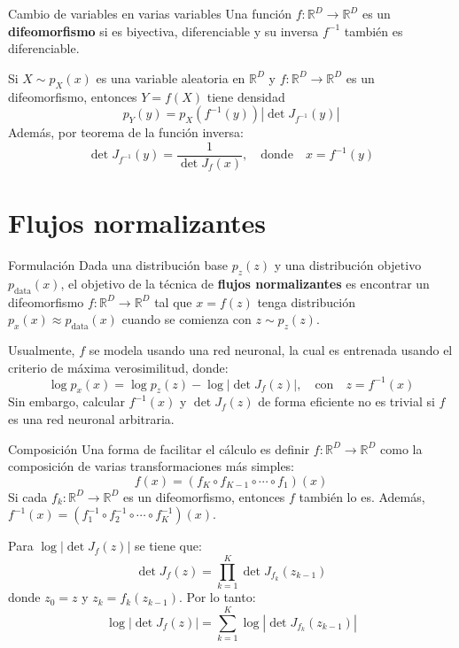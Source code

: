 \documentclass{beamer}
\newcommand{\R}{\mathbb{R}}
\begin{document}
\begin{frame}{Cambio de variables en varias variables}
    Una función $f:\R^D\to\R^D$ es un \textbf{difeomorfismo} si es biyectiva, diferenciable y su inversa $f^{-1}$ también es diferenciable.

    Si $X\sim p_X(x)$ es una variable aleatoria en $\R^D$ y $f:\R^D\to\R^D$ es un difeomorfismo, entonces $Y=f(X)$ tiene densidad
    \begin{equation*}
        p_Y(y) = p_X(f^{-1}(y))\left|\det J_{f^{-1}}(y)\right|
    \end{equation*}
    Además, por teorema de la función inversa:
    \begin{equation*}
        \det J_{f^{-1}}(y) = \frac{1}{\det J_f(x)},
        \quad\text{donde}\quad
        x = f^{-1}(y)
    \end{equation*}
\end{frame}

\section{Flujos normalizantes}

\begin{frame}{Formulación}
    Dada una distribución base $p_z(z)$ y una distribución objetivo $p_\text{data}(x)$, el objetivo de la técnica de \textbf{flujos normalizantes}
    es encontrar un difeomorfismo $f:\R^D\to\R^D$ tal que $x=f(z)$ tenga distribución $p_x(x)\approx p_\text{data}(x)$ cuando se comienza con $z\sim p_z(z)$.

    Usualmente, $f$ se modela usando una red neuronal, la cual es entrenada usando el criterio de máxima verosimilitud, donde:
    \begin{equation*}
        \log p_x(x) = \log p_z(z) - \log\left|\det J_f(z)\right|,
        \quad\text{con}\quad
        z = f^{-1}(x)
    \end{equation*}
    Sin embargo, calcular $f^{-1}(x)$ y $\det J_f(z)$ de forma eficiente no es trivial si $f$ es una red neuronal arbitraria.
\end{frame}

\begin{frame}{Composición}
    Una forma de facilitar el cálculo es definir $f:\R^D\to\R^D$ como la composición de varias transformaciones más simples:
    \begin{equation*}
        f(x) = \left(f_K\circ f_{K-1}\circ\cdots\circ f_1\right)(x)
    \end{equation*}
    Si cada $f_k:\R^D\to\R^D$ es un difeomorfismo, entonces $f$ también lo es. Además, $f^{-1}(x) = \left(f_1^{-1}\circ f_2^{-1}\circ\cdots\circ f_K^{-1}\right)(x)$.

    Para $\log \left|\det J_f(z)\right|$ se tiene que:
    \begin{equation*}
        \det J_f(z) = \prod_{k=1}^{K}\det J_{f_k}(z_{k-1})
    \end{equation*}
    donde $z_0 = z$ y $z_k=f_k(z_{k-1})$. Por lo tanto:
    \begin{equation*}
        \log\left|\det J_f(z)\right| = \sum_{k=1}^K \log\left|\det J_{f_k}(z_{k-1})\right|
    \end{equation*}
\end{frame}
\end{document}
